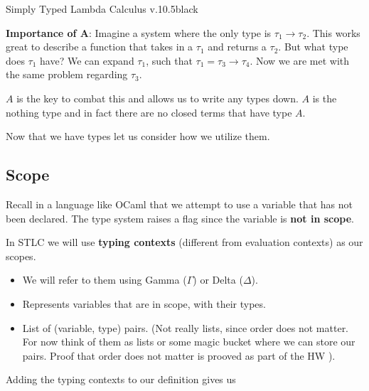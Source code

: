 \documentclass{lecturenotes}
\begin{document}
\begin{center}
\begin{alert}{Simply Typed Lambda Calculus v.1}{0.5\textwidth}{black}
  \begin{syntax}   
    \category[Types]{\tau}
  \end{syntax}
\end{alert}
\end{center}

\textbf{Importance of A}: Imagine a system where the only type is $\tau_1 \rightarrow \tau_2$. 
  This works great to describe a function that takes in a $\tau_1$ and returns a $\tau_2$. 
  But what type does $\tau_1$ have? 
  We can expand $\tau_1$, such that $\tau_1 = \tau_3 \rightarrow \tau_4$. 
  Now we are met with the same problem regarding $\tau_3$. 

$A$ is the key to combat this and allows us to write any types down. 
  $A$ is the nothing type and in fact there are no closed terms that have type $A$. 

Now that we have types let us consider how we utilize them. 

\subsection{Scope}

Recall in a language like OCaml that we attempt to use a variable that has not been declared. 
  The type system raises a flag since the variable is \textbf{not in scope}.

In STLC we will use \textbf{typing contexts} (different from evaluation contexts) as our scopes.

\begin{itemize}
  \item We will refer to them using Gamma ($\Gamma$) or Delta ($\Delta$).
  \item Represents variables that are in scope, with their types.
  \item List of (variable, type) pairs. 
    (Not really lists, since order does not matter. 
    For now think of them as lists or some magic bucket where we can store our pairs.
    Proof that order does not matter is prooved as part of the HW ).
\end{itemize}

Adding the typing contexts to our definition gives us 
\end{document}
